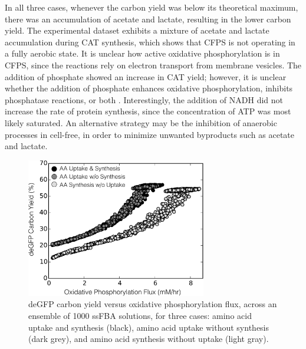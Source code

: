 \documentclass[journal=asbcd6,manuscript=article]{achemso}
\begin{document}
In all three cases, whenever the carbon yield was below its theoretical maximum, there was an accumulation of acetate and lactate, resulting in the lower carbon yield.
The experimental dataset exhibits a mixture of acetate and lactate accumulation during CAT synthesis, which shows that CFPS is not operating in a fully aerobic state.
It is unclear how active oxidative phosphorylation is in CFPS, since the reactions rely on electron transport from membrane vesicles.
The addition of phosphate showed an increase in CAT yield; however, it is unclear whether the addition of phosphate enhances oxidative phosphorylation, inhibits phosphatase reactions, or both \cite{Jewett:2008aa}.
Interestingly, the addition of NADH did not increase the rate of protein synthesis, since the concentration of ATP was most likely saturated.
An alternative strategy may be the inhibition of anaerobic processes in cell-free, in order to minimize unwanted byproducts such as acetate and lactate.
\begin{figure}[t!]
\includegraphics[width=0.7\textwidth]{./Figures/Yield_Ox.pdf}
\caption{deGFP carbon yield versus oxidative phosphorylation flux, across an ensemble of 1000 ssFBA solutions, for three cases: amino acid uptake and synthesis (black), amino acid uptake without synthesis (dark grey), and amino acid synthesis without uptake (light gray).}
\label{fig:oxphos_yield}
\end{figure}
\end{document}
